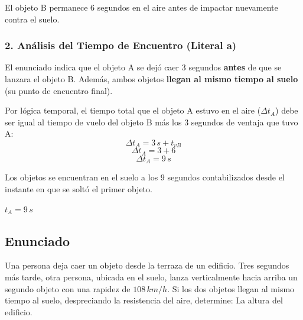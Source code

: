 \documentclass[12pt, a4paper]{article}
\begin{document}
El objeto B permanece $6$ segundos en el aire antes de impactar nuevamente contra el suelo.

\subsubsection*{2. Análisis del Tiempo de Encuentro (Literal a)}
El enunciado indica que el objeto A se dejó caer $3$ segundos \textbf{antes} de que se lanzara el objeto B. 
Además, ambos objetos \textbf{llegan al mismo tiempo al suelo} (su punto de encuentro final).

Por lógica temporal, el tiempo total que el objeto A estuvo en el aire ($\Delta t_A$) debe ser igual al tiempo de vuelo del objeto B más los $3$ segundos de ventaja que tuvo A:
$$ \Delta t_A = 3 \, \si{s} + t_{vB} $$
$$ \Delta t_A = 3 + 6 $$
$$ \Delta t_A = 9 \, \si{s} $$

Los objetos se encuentran en el suelo a los $9$ segundos contabilizados desde el instante en que se soltó el primer objeto.

\begin{tcolorbox}[colback=green!5!white, colframe=green!50!black, title=Respuesta a)]
\centering \Large $t_A = 9 \, \si{s}$
\end{tcolorbox}


\newpage

\subsection*{Enunciado}
Una persona deja caer un objeto desde la terraza de un edificio. Tres segundos más tarde, otra persona, ubicada en el suelo, lanza verticalmente hacia arriba un segundo objeto con una rapidez de $108 \, \si{km/h}$. Si los dos objetos llegan al mismo tiempo al suelo, despreciando la resistencia del aire, determine: La altura del edificio.
\end{document}
